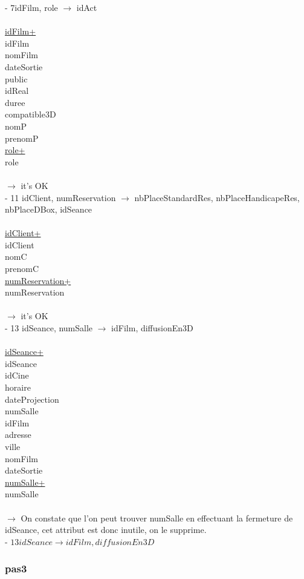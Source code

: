 \documentclass[a4paper,sffamily,12pt]{article}
\begin{document}
						\noindent - 7idFilm, role $\rightarrow$  idAct \\
							\\
							\underline{idFilm+} \\
							idFilm \\
							nomFilm \\
							dateSortie \\
							public \\
							idReal \\
							duree \\
							compatible3D \\
							nomP \\
							prenomP \\
							\underline{role+} \\
							role \\
							\\
						$\rightarrow$ it's OK \\
							
						\noindent - 11 idClient, numReservation $\rightarrow$ nbPlaceStandardRes, nbPlaceHandicapeRes, nbPlaceDBox, idSeance \\
							\\
							\underline{idClient+} \\
							idClient \\
							nomC \\
							prenomC \\
							\underline{numReservation+} \\
							numReservation \\	
							\\									
						$\rightarrow$ it's OK \\					
												
						\noindent - 13 idSeance, numSalle $\rightarrow$ idFilm, diffusionEn3D \\							
							\\
							\underline{idSeance+} \\ 
							idSeance \\
							idCine \\
							horaire \\
							dateProjection \\
							numSalle \\
							idFilm \\
							adresse \\
							ville \\
							nomFilm \\
							dateSortie \\
							\underline{numSalle+} \\
							numSalle \\
							\\
						$\rightarrow$ On constate que l'on peut trouver numSalle en effectuant la fermeture de idSeance, cet attribut est donc inutile, on le supprime. \\
						- $ 13 idSeance \rightarrow idFilm, diffusionEn3D$ \\
		
					\subsubsection{pas3}		
			
\end{document}
